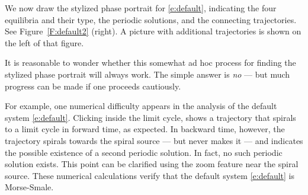 \documentclass{ximera}
\begin{document}
We now draw the stylized phase portrait
 for \eqref{e:default},
indicating the four equilibria and their type, the periodic
solutions, and the connecting trajectories. See
Figure~\ref{F:default2} (right).  A picture with additional 
trajectories is shown on the left of that figure.

\begin{figure*}[htb]
           \centerline{%
		}
           \caption{(Left) Additional trajectories of 
\protect\eqref{e:default}. (Right) Stylized phase portrait
indicating equilibria, periodic solutions and connecting trajectories.}
           \label{F:default2}
\end{figure*}

It is reasonable to wonder whether this somewhat ad hoc process
for finding the stylized phase portrait will always work.  The
simple answer is {\em no} --- but much progress can be made if
one proceeds cautiously.  

For example, one numerical difficulty appears in the analysis of
the default system \eqref{e:default}.  Clicking inside the limit
cycle, shows a trajectory that spirals to a limit cycle in
forward time, as expected. In backward time, however, the
trajectory spirals towards the spiral source --- but never makes
it --- and {\pplane} indicates the possible existence of a
second periodic solution.  In fact, no such periodic solution
exists. This point can be clarified using the zoom feature near
the spiral source.  These numerical calculations verify that the 
default system \eqref{e:default} is Morse-Smale.



\end{document}
